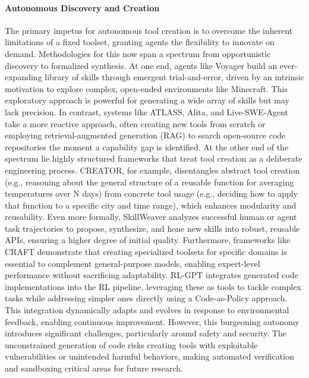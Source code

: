 \paragraph{Autonomous Discovery and Creation}
The primary impetus for autonomous tool creation is to overcome the inherent limitations of a fixed toolset, granting agents the flexibility to innovate on demand. Methodologies for this now span a spectrum from opportunistic discovery to formalized synthesis. At one end, agents like Voyager build an ever-expanding library of skills through emergent trial-and-error, driven by an intrinsic motivation to explore complex, open-ended environments like Minecraft\citep{wang2023voyager}. This exploratory approach is powerful for generating a wide array of skills but may lack precision. In contrast, systems like ATLASS, Alita, and Live-SWE-Agent take a more reactive approach, often creating new tools from scratch or employing retrieval-augmented generation (RAG) to search open-source code repositories the moment a capability gap is identified\citep{Haque2025ATLASS, qiu2025alita, qiu2025alitag, xia2025livesweagent}.
At the other end of the spectrum lie highly structured frameworks that treat tool creation as a deliberate engineering process. CREATOR, for example, disentangles abstract tool creation (e.g., reasoning about the general structure of a reusable function for averaging temperatures over N days) from concrete tool usage (e.g., deciding how to apply that function to a specific city and time range), which enhances modularity and reusability\citep{qian2023creator}. Even more formally, SkillWeaver analyzes successful human or agent task trajectories to propose, synthesize, and hone new skills into robust, reusable APIs, ensuring a higher degree of initial quality\citep{zheng2025skillweaver}. Furthermore, frameworks like CRAFT demonstrate that creating specialized toolsets for specific domains is essential to complement general-purpose models, enabling expert-level performance without sacrificing adaptability\citep{yuan2024craft}. RL-GPT\citep{liu2024rl} integrates generated code implementations into the RL pipeline, leveraging these as tools to tackle complex tasks while addressing simpler ones directly using a Code-as-Policy approach. This integration dynamically adapts and evolves in response to environmental feedback, enabling continuous improvement. However, this burgeoning autonomy introduces significant challenges, particularly around safety and security. The unconstrained generation of code risks creating tools with exploitable vulnerabilities or unintended harmful behaviors, making automated verification and sandboxing critical areas for future research.

